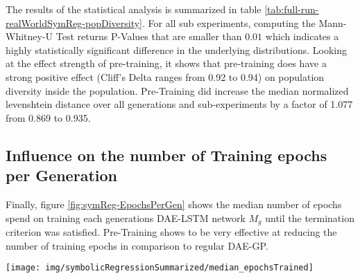 \documentclass[
  11pt,
]{article}
\let\origfigure\figure
\let\endorigfigure\endfigure
\renewenvironment{figure}[1][2] {
    \expandafter\origfigure\expandafter[H]
} {
    \endorigfigure
}
\begin{document}
The results of the statistical analysis is summarized in table \ref{tab:full-run-realWorldSymReg-popDiversity}.
For all sub experiments, computing the Mann-Whitney-U Test returns P-Values that are smaller than \(0.01\) which indicates a highly statistically significant difference in the underlying distributions.
Looking at the effect strength of pre-training, it shows that pre-training does have a strong positive effect (Cliff's Delta ranges from 0.92 to 0.94) on population diversity inside the population.
Pre-Training did increase the median normalized levenshtein distance over all generations and sub-experiments by a factor of 1.077 from 0.869 to 0.935.

\hypertarget{influence-on-the-number-of-training-epochs-per-generation}{%
\subsection{Influence on the number of Training epochs per Generation}\label{influence-on-the-number-of-training-epochs-per-generation}}

Finally, figure \ref{fig:symReg-EpochsPerGen} shows the median number of epochs spend on training each generations DAE-LSTM network \(M_g\) until the termination criterion was satisfied.
Pre-Training shows to be very effective at reducing the number of training epochs in comparison to regular DAE-GP.

\begin{figure}[c]

{\centering \texttt{[image: img/symbolicRegressionSummarized/median\_epochsTrained]} 

}

\caption{Training Epochs over 30 Generations - Real World Symbolic Regression}\label{fig:symReg-EpochsPerGen}
\end{figure}
\end{document}
